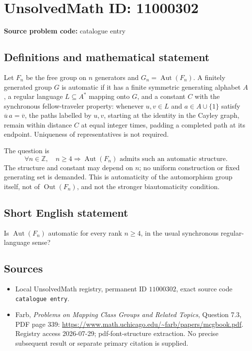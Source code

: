 \documentclass[11pt]{article}
\newcommand{\Z}{\mathbb{Z}}
\begin{document}
\section*{UnsolvedMath ID: 11000302}
\textbf{Source problem code:} catalogue entry
\subsection{Definitions and mathematical statement}
Let \(F_n\) be the free group on \(n\) generators and \(G_n=\operatorname{Aut}(F_n)\). A finitely generated group \(G\) is automatic if it has a finite symmetric generating alphabet \(A\), a regular language \(L\subseteq A^*\) mapping onto \(G\), and a constant \(C\) with the synchronous fellow-traveler property: whenever \(u,v\in L\) and \(a\in A\cup\{1\}\) satisfy \(\overline u\,a=\overline v\), the paths labelled by \(u,v\), starting at the identity in the Cayley graph, remain within distance \(C\) at equal integer times, padding a completed path at its endpoint. Uniqueness of representatives is not required.

The question is
\[\forall n\in\Z,\quad n\geq4\Longrightarrow\operatorname{Aut}(F_n)\text{ admits such an automatic structure}.\]
The structure and constant may depend on \(n\); no uniform construction or fixed generating set is demanded. This is automaticity of the automorphism group itself, not of \(\operatorname{Out}(F_n)\), and not the stronger biautomaticity condition.
\subsection{Short English statement}
Is \(\operatorname{Aut}(F_n)\) automatic for every rank \(n\geq4\), in the usual synchronous regular-language sense?
\subsection{Sources}
\begin{itemize}
\item Local UnsolvedMath registry, permanent ID \(11000302\), exact source code \texttt{catalogue entry}.
\item Farb, \emph{Problems on Mapping Class Groups and Related Topics}, Question 7.3, PDF page 339: \url{https://www.math.uchicago.edu/~farb/papers/mcgbook.pdf}. Registry access 2026-07-29; pdf-font-structure extraction. No precise subsequent result or separate primary citation is supplied.
\end{itemize}
\end{document}
